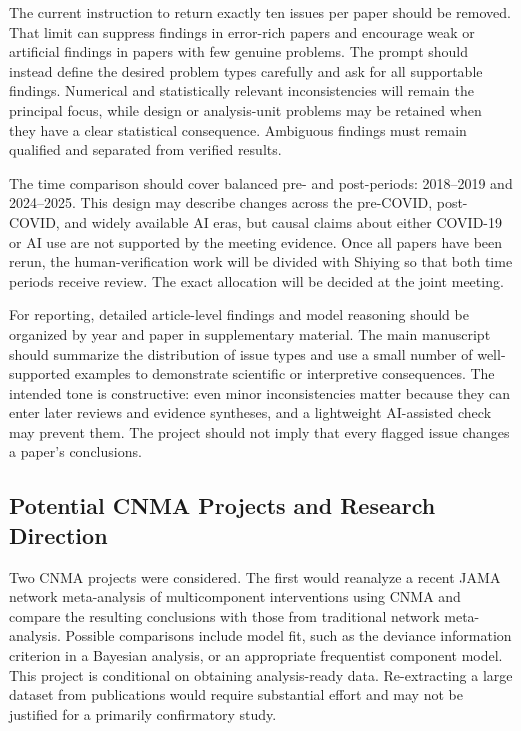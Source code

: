 \documentclass[11pt]{article}
\begin{document}
The current instruction to return exactly ten issues per paper should be removed. That limit can suppress findings in error-rich papers and encourage weak or artificial findings in papers with few genuine problems. The prompt should instead define the desired problem types carefully and ask for all supportable findings. Numerical and statistically relevant inconsistencies will remain the principal focus, while design or analysis-unit problems may be retained when they have a clear statistical consequence. Ambiguous findings must remain qualified and separated from verified results.

The time comparison should cover balanced pre- and post-periods: 2018--2019 and 2024--2025. This design may describe changes across the pre-COVID, post-COVID, and widely available AI eras, but causal claims about either COVID-19 or AI use are not supported by the meeting evidence. Once all papers have been rerun, the human-verification work will be divided with Shiying so that both time periods receive review. The exact allocation will be decided at the joint meeting.

For reporting, detailed article-level findings and model reasoning should be organized by year and paper in supplementary material. The main manuscript should summarize the distribution of issue types and use a small number of well-supported examples to demonstrate scientific or interpretive consequences. The intended tone is constructive: even minor inconsistencies matter because they can enter later reviews and evidence syntheses, and a lightweight AI-assisted check may prevent them. The project should not imply that every flagged issue changes a paper's conclusions.

\subsection*{Potential CNMA Projects and Research Direction}

Two CNMA projects were considered. The first would reanalyze a recent JAMA network meta-analysis of multicomponent interventions using CNMA and compare the resulting conclusions with those from traditional network meta-analysis. Possible comparisons include model fit, such as the deviance information criterion in a Bayesian analysis, or an appropriate frequentist component model. This project is conditional on obtaining analysis-ready data. Re-extracting a large dataset from publications would require substantial effort and may not be justified for a primarily confirmatory study.
\end{document}

